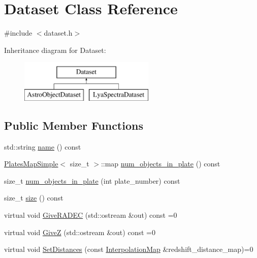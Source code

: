 \hypertarget{class_dataset}{\section{Dataset Class Reference}
\label{class_dataset}
}


{\ttfamily \#include $<$dataset.\-h$>$}

Inheritance diagram for Dataset\-:\begin{figure}[H]
\begin{center}
\leavevmode
\includegraphics[height=2.000000cm]{class_dataset}
\end{center}
\end{figure}
\subsection*{Public Member Functions}
\begin{DoxyCompactItemize}
\item 
std\-::string \hyperlink{class_dataset_a7cacad140eadb450c4a0d6b1a9cd9ed0}{name} () const 
\item 
\hyperlink{struct_plates_map_simple}{Plates\-Map\-Simple}$<$ size\-\_\-t $>$\-::map \hyperlink{class_dataset_ab71a9a9e09ab029e37a7a69dbee63f2f}{num\-\_\-objects\-\_\-in\-\_\-plate} () const 
\item 
size\-\_\-t \hyperlink{class_dataset_a6b1f378ed9e786c2c7f60a82e4bbc834}{num\-\_\-objects\-\_\-in\-\_\-plate} (int plate\-\_\-number) const 
\item 
size\-\_\-t \hyperlink{class_dataset_ab28cc36ef5e2b5ba5fd055ba7d113c6d}{size} () const 
\item 
virtual void \hyperlink{class_dataset_a5867a14c1554b50ce062bdacd36460af}{Give\-R\-A\-D\-E\-C} (std\-::ostream \&out) const =0
\item 
virtual void \hyperlink{class_dataset_aae82d78ec374da243c22a96236b39465}{Give\-Z} (std\-::ostream \&out) const =0
\item 
virtual void \hyperlink{class_dataset_a76dbae8574850da55a3b88149ccbe3f9}{Set\-Distances} (const \hyperlink{class_interpolation_map}{Interpolation\-Map} \&redshift\-\_\-distance\-\_\-map)=0
\end{DoxyCompactItemize}
